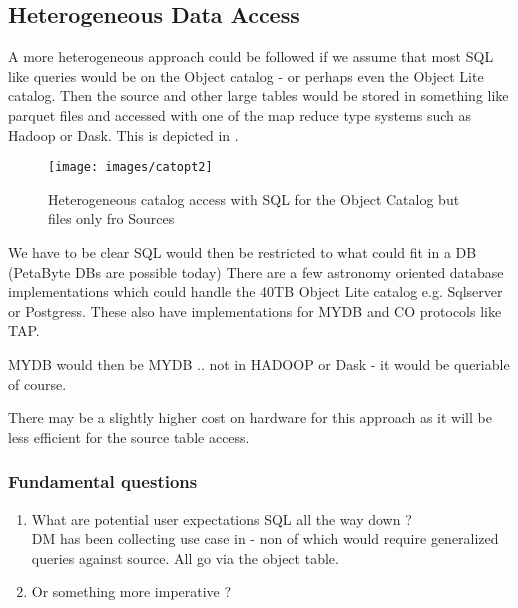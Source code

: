 \subsection{Heterogeneous Data Access }
 A more heterogeneous approach could be followed if we assume that most SQL like queries would be on the Object catalog - or perhaps even the Object Lite catalog.  Then the source and other large tables would be stored in something like parquet files and accessed with one of the map reduce type systems such as Hadoop or Dask. This is depicted in .

\begin{figure}
\begin{center}
 \texttt{[image: images/catopt2]}
\caption{ Heterogeneous catalog access with SQL for the Object Catalog but files only fro Sources \label{fig:catopt2}}
\end{center}
\end{figure}

We have to be clear SQL would then be restricted to what could fit in a DB (PetaByte DBs are possible today)
There are a few astronomy oriented database implementations which could handle the 40TB Object Lite catalog e.g. Sqlserver or Postgress. These also have implementations for MYDB and CO protocols like TAP.

MYDB would then be MYDB .. not in HADOOP or Dask - it would be queriable of course.

There may be a slightly higher cost on hardware for this approach as it will be less efficient for the source table access.

\subsubsection{Fundamental questions}
\begin{enumerate}
 \item What are potential user expectations SQL all the way down ? \\
DM has been collecting use case in  - non of which would require generalized queries against source. All go via the object table.
 \item Or something more imperative ?
\end{enumerate}


